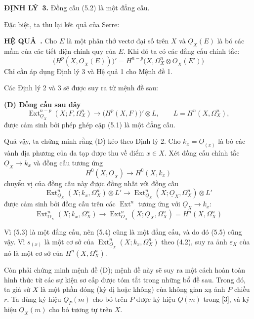 \documentclass[11pt,twoside,openany]{book}
\numberwithin{equation}{section}
\newcommand{\src}[1]{%
  \phantomsection\hypertarget{src:\fgasourceid:#1}{}%
  \marginpar{\raggedleft\footnotesize\sffamily #1}%
}
\newcommand{\fgasourceid}{unset}
\newcommand{\Osh}{\underline{O}}
\newcommand{\result}[2]{\par\medskip\noindent\textbf{#1\if\relax\detokenize{#2}\relax\else\ #2\fi.}\quad}
\begin{document}
\result{ĐỊNH LÝ}{3} Đồng cấu (5.2) là một đẳng cấu.

Đặc biệt, ta thu lại kết quả của Serre:

\result{HỆ QUẢ}{} Cho $E$ là một phân thớ vectơ đại số trên $X$ và
$\Osh_X(E)$ là bó các mầm của các tiết diện chính quy của $E$. Khi đó ta có các
đẳng cấu chính tắc:
\begin{equation}\tag{5.3}
  \bigl(H^{p}(X,\Osh_X(E))\bigr)'
  =H^{n-p}\bigl(X,\Omega_X^{n}\otimes\Osh_X(E')\bigr)
\end{equation}
Chỉ cần áp dụng Định lý 3 và Hệ quả 1 cho Mệnh đề 1.

Các Định lý 2 và 3 sẽ được suy ra từ mệnh đề sau:

\noindent\textbf{(D) Đồng cấu sau đây}
\begin{equation}\tag{5.2 bis}
  \operatorname{Ext}_{\Osh_X}^{n-p}(X;F,\Omega_X^{n})
  \longrightarrow\bigl(H^{p}(X,F)\bigr)'\otimes L,
  \qquad L=H^{n}(X,\Omega_X^{n}),
\end{equation}
được cảm sinh bởi phép ghép cặp (5.1) là một đẳng cấu.

Quả vậy, ta chứng minh rằng (D) kéo theo Định lý 2. Cho
$k_x=\Osh_{(x)}$ là bó các vành địa phương của đa tạp được thu về điểm
$x\in X$. Xét đồng cấu chính tắc
$\Osh_X\longrightarrow k_x$ và đồng cấu tương ứng
\begin{equation}\tag{5.3}
  H^{0}(X,\Osh_X)\longrightarrow H^{0}(X,k_x)
\end{equation}
chuyển vị của đồng cấu này được đồng nhất với đồng cấu
\begin{equation}\tag{5.4}
  \operatorname{Ext}_{\Osh_X}^{n}(X;k_x,\Omega_X^{n})\otimes L'
  \longrightarrow
  \operatorname{Ext}_{\Osh_X}^{n}(X;\Osh_X,\Omega_X^{n})\otimes L'
\end{equation}
được cảm sinh bởi đồng cấu trên các $\operatorname{Ext}^{n}$ tương ứng với
$\Osh_X\longrightarrow k_x$:
\begin{equation}\tag{5.5}
  \operatorname{Ext}_{\Osh_X}^{n}(X;k_x,\Omega_X^{n})
  \longrightarrow
  \operatorname{Ext}_{\Osh_X}^{n}(X;\Osh_X,\Omega_X^{n})
  =H^{n}(X,\Omega_X^{n})
\end{equation}


\src{183}
Vì (5.3) là một đẳng cấu, nên (5.4) cũng là một đẳng cấu, và do đó (5.5)
cũng vậy. Vì $s_{(x)}$ là một cơ sở của
$\operatorname{Ext}_{\Osh_X}^{n}(X;k_x,\Omega_X^{n})$ theo (4.2), suy ra ảnh
$\varepsilon_X$ của nó là một cơ sở của $H^{n}(X,\Omega_X^{n})$.

Còn phải chứng minh mệnh đề (D); mệnh đề này sẽ suy ra một cách hoàn toàn hình
thức từ các sự kiện sơ cấp được tóm tắt trong những bổ đề sau. Trong đó, ta giả
sử $X$ là một phần đóng (kỳ dị hoặc không) của không gian xạ ảnh $P$ chiều
$r$. Ta dùng ký hiệu $\Osh_P(m)$ cho bó trên $P$ được ký hiệu $\Osh(m)$ trong
[3], và ký hiệu $\Osh_X(m)$ cho bó tương tự trên $X$.
\end{document}

